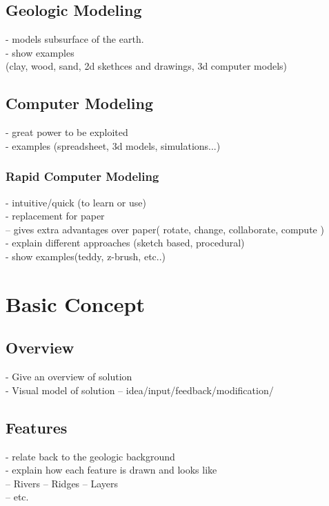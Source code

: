 \documentclass[a4paper,12pt]{article}
\begin{document}
\subsection{Geologic Modeling}

- models subsurface of the earth.\\
- show examples\\(clay, wood, sand, 2d skethces and drawings, 3d computer models)

\subsection{Computer Modeling}
- great power to be exploited\\
- examples (spreadsheet, 3d models, simulations...)\\
\subsubsection{Rapid Computer Modeling}
- intuitive/quick (to learn or use)\\
- replacement for paper\\
  -- gives extra advantages over paper( rotate, change, collaborate, compute )\\
- explain different approaches (sketch based, procedural)\\
- show examples(teddy, z-brush, etc..)\\


\section{Basic Concept}
\label{sec:concept}
\subsection{Overview}
- Give an overview of solution\\
- Visual model of solution
  -- idea/input/feedback/modification/
\subsection{Features}
- relate back to the geologic background\\
- explain how each feature is drawn and looks like\\
   -- Rivers
   -- Ridges
   -- Layers\\
   -- etc.\\
\end{document}
